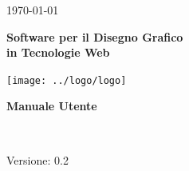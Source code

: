 \usepackage{multirow}
\title{\TITOLODOC}
\author{Marco Cunico}



\renewcommand{\insertversion}{0.2} %
\renewcommand{\TITOLODOC}{Manuale Utente} %
\renewcommand{\glosspath}{.\glossario} %

\begin{titlepage}
\begin{center}
	\begin{Large}	\today \end{Large}
\end{center}

\vspace{20pt}

\begin{center}
	\begin{Huge}
				\textbf{\ajax}
	\end{Huge}
\end{center}			

\begin{center}
	\begin{large}
				\textbf{Software per il Disegno Grafico\\ in Tecnologie Web}
	\end{large}
\end{center}			

\vspace{20pt}

\begin{center}
\texttt{[image: ../logo/logo]}
\end{center}

\vspace{170pt}
\begin{center} %
	\begin{Huge}
				\textbf{\TITOLODOC}
	\end{Huge}
			\\
\end{center}
\vspace{190pt}
\begin{center}
Versione: \insertversion
\end{center}
\end{titlepage}

\newpage

